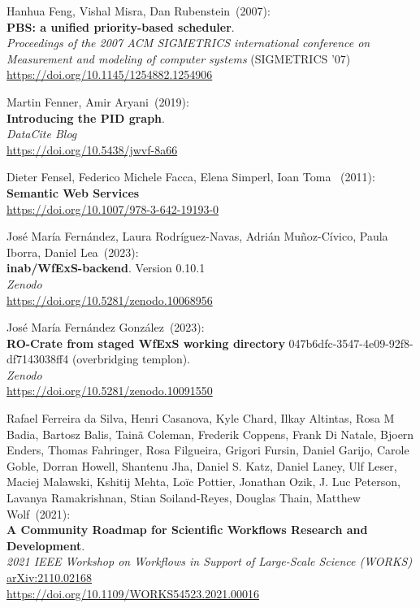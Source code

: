 \begin{thebibliography}{9}
Hanhua Feng, Vishal Misra, Dan Rubenstein~(2007): \\
\textbf{PBS: a unified priority-based scheduler}.\\
\emph{Proceedings of the 2007 ACM SIGMETRICS international conference on Measurement and modeling of computer systems} (SIGMETRICS '07)\\
\url{https://doi.org/10.1145/1254882.1254906} 

Martin Fenner, Amir Aryani~(2019): \\
\textbf{Introducing the PID graph}. \\
\emph{DataCite Blog}\\
\url{https://doi.org/10.5438/jwvf-8a66}

Dieter Fensel, Federico Michele Facca, Elena Simperl, Ioan Toma ~(2011): \\
\textbf{Semantic {Web Services}}\\
\url{https://doi.org/10.1007/978-3-642-19193-0}

José María Fernández, Laura Rodríguez-Navas, Adrián Muñoz-Cívico, Paula Iborra, Daniel Lea~(2023): \\
\textbf{inab/WfExS-backend}. Version 0.10.1\\
\emph{Zenodo} \\
\url{https://doi.org/10.5281/zenodo.10068956}

José María Fernández González~(2023): \\
\textbf{RO-Crate from staged WfExS working directory} 047b6dfc-3547-4e09-92f8-df7143038ff4 (overbridging templon).\\
\emph{Zenodo} \\
\url{https://doi.org/10.5281/zenodo.10091550}

Rafael Ferreira da Silva, Henri Casanova, Kyle Chard, Ilkay Altintas, Rosa M Badia, Bartosz Balis, Tainã Coleman, Frederik Coppens, Frank Di Natale, Bjoern Enders, Thomas Fahringer, Rosa Filgueira, Grigori Fursin, Daniel Garijo, Carole Goble, Dorran Howell, Shantenu Jha, Daniel S. Katz, Daniel Laney, Ulf Leser, Maciej Malawski, Kshitij Mehta, Loïc Pottier, Jonathan Ozik, J. Luc Peterson, Lavanya Ramakrishnan, Stian Soiland-Reyes, Douglas Thain, Matthew Wolf~(2021): \\
\textbf{A Community Roadmap for Scientific Workflows Research and Development}.\\
\emph{2021 IEEE Workshop on Workflows in Support of Large-Scale Science (WORKS)}\\
\href{https://doi.org/10.48550/arXiv.2110.02168}{arXiv:2110.02168}\\
\url{https://doi.org/10.1109/WORKS54523.2021.00016}


\end{thebibliography}
